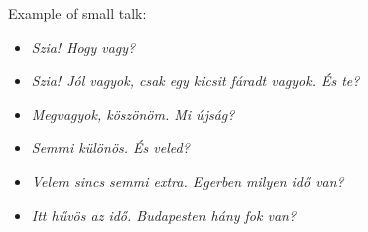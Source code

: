 \documentclass[a4paper,11pt]{article}
\begin{document}
\newpage

\noindent Example of small talk:

\begin{itemize}

  \item[---] \emph{Szia! Hogy vagy?}

  \item[---] \emph{Szia! Jól vagyok, csak egy kicsit fáradt vagyok. És
  te?}

  \item[---] \emph{Megvagyok, köszönöm. Mi újság?}

  \item[---] \emph{Semmi különös. És veled?}

  \item[---] \emph{Velem sincs semmi extra. Egerben milyen idő van?}

  \item[---] \emph{Itt hűvös az idő. Budapesten hány fok van?}

\end{itemize}
\end{document}
